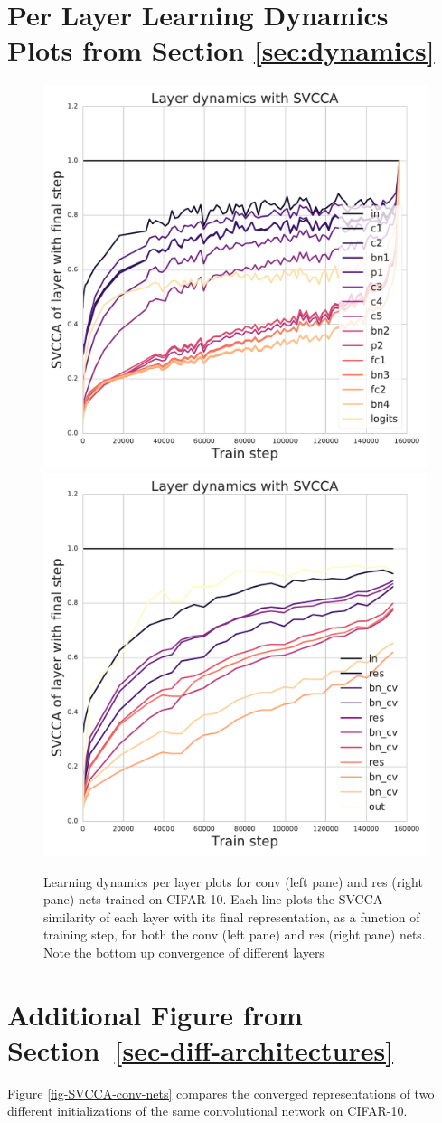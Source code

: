 \documentclass{article} %
\begin{document}
\section{Per Layer Learning Dynamics Plots from Section \ref{sec:dynamics}}

\begin{figure}[ht]
  \centering
  \vspace*{0.5cm}
  \includegraphics[width=0.4\columnwidth]{figures_nips/diag_dynamics_convnet_mean.pdf}
  \includegraphics[width=0.4\columnwidth]{figures_nips/diag_dynamics_resnet_mean.pdf}

  \caption{\small Learning dynamics per layer plots for conv (left pane) and res (right pane) nets trained on CIFAR-10. Each line plots the SVCCA similarity of each layer with its final representation, as a function of training step, for both the conv (left pane) and res (right pane) nets. Note the bottom up convergence of different layers
}
   \label{fig-dynamics-per-layer}
   \vspace*{-0.9em}
 \end{figure}
 
 
 \section{Additional Figure from Section~\ref{sec-diff-architectures}}
Figure \ref{fig-SVCCA-conv-nets} compares the converged representations of two different initializations of the same convolutional network on CIFAR-10. 
\end{document}
